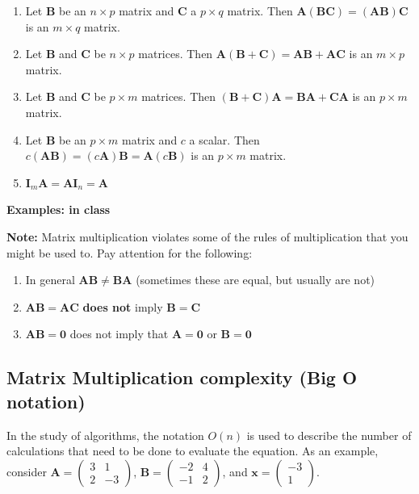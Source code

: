 \documentclass[
]{book}
\theoremstyle{definition}
\theoremstyle{definition}
\theoremstyle{definition}
\theoremstyle{definition}
\theoremstyle{remark}
\begin{document}
\begin{enumerate}
\def\labelenumi{\arabic{enumi})}
\item
  Let \(\mathbf{B}\) be an \(n \times p\) matrix and \(\mathbf{C}\) a \(p \times q\) matrix. Then \(\mathbf{A}(\mathbf{B}\mathbf{C}) = (\mathbf{A}\mathbf{B})\mathbf{C}\) is an \(m \times q\) matrix.
\item
  Let \(\mathbf{B}\) and \(\mathbf{C}\) be \(n \times p\) matrices. Then \(\mathbf{A}(\mathbf{B} + \mathbf{C}) = \mathbf{A}\mathbf{B} + \mathbf{A}\mathbf{C}\) is an \(m \times p\) matrix.
\item
  Let \(\mathbf{B}\) and \(\mathbf{C}\) be \(p \times m\) matrices. Then \((\mathbf{B} + \mathbf{C})\mathbf{A} = \mathbf{B}\mathbf{A} + \mathbf{C}\mathbf{A}\) is an \(p \times m\) matrix.
\item
  Let \(\mathbf{B}\) be an \(p \times m\) matrix and \(c\) a scalar. Then \(c(\mathbf{A} \mathbf{B}) = (c \mathbf{A}) \mathbf{B} = \mathbf{A}(c\mathbf{B})\) is an \(p \times m\) matrix.
\item
  \(\mathbf{I}_m \mathbf{A} = \mathbf{A} \mathbf{I}_n = \mathbf{A}\)
\end{enumerate}

\textbf{Examples: in class}

\textbf{Note:} Matrix multiplication violates some of the rules of multiplication that you might be used to. Pay attention for the following:

\begin{enumerate}
\def\labelenumi{\arabic{enumi})}
\item
  In general \(\mathbf{A} \mathbf{B} \neq \mathbf{B} \mathbf{A}\) (sometimes these are equal, but usually are not)
\item
  \(\mathbf{A}\mathbf{B} = \mathbf{A} \mathbf{C}\) \textbf{does not} imply \(\mathbf{B} = \mathbf{C}\)
\item
  \(\mathbf{A}\mathbf{B} = \mathbf{0}\) does not imply that \(\mathbf{A} = \mathbf{0}\) or \(\mathbf{B} = \mathbf{0}\)
\end{enumerate}

\hypertarget{matrix-multiplication-complexity-big-o-notation}{%
\subsection{Matrix Multiplication complexity (Big O notation)}\label{matrix-multiplication-complexity-big-o-notation}}

In the study of algorithms, the notation \(O(n)\) is used to describe the number of calculations that need to be done to evaluate the equation. As an example, consider \(\mathbf{A} = \begin{pmatrix}3 & 1 \\ 2 & -3 \end{pmatrix}\), \(\mathbf{B} = \begin{pmatrix} -2 & 4 \\ -1 & 2 \end{pmatrix}\), and \(\mathbf{x} = \begin{pmatrix} -3 \\ 1 \end{pmatrix}\).
\end{document}

